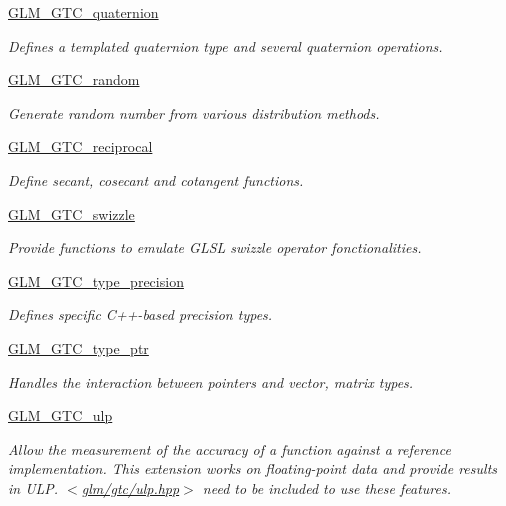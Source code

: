 \begin{DoxyCompactItemize}
\hyperlink{group__gtc__quaternion}{G\+L\+M\+\_\+\+G\+T\+C\+\_\+quaternion}
\begin{DoxyCompactList}\small\item\em Defines a templated quaternion type and several quaternion operations. \end{DoxyCompactList}\item 
\hyperlink{group__gtc__random}{G\+L\+M\+\_\+\+G\+T\+C\+\_\+random}
\begin{DoxyCompactList}\small\item\em Generate random number from various distribution methods. \end{DoxyCompactList}\item 
\hyperlink{group__gtc__reciprocal}{G\+L\+M\+\_\+\+G\+T\+C\+\_\+reciprocal}
\begin{DoxyCompactList}\small\item\em Define secant, cosecant and cotangent functions. \end{DoxyCompactList}\item 
\hyperlink{group__gtc__swizzle}{G\+L\+M\+\_\+\+G\+T\+C\+\_\+swizzle}
\begin{DoxyCompactList}\small\item\em Provide functions to emulate G\+L\+S\+L swizzle operator fonctionalities. \end{DoxyCompactList}\item 
\hyperlink{group__gtc__type__precision}{G\+L\+M\+\_\+\+G\+T\+C\+\_\+type\+\_\+precision}
\begin{DoxyCompactList}\small\item\em Defines specific C++-\/based precision types. \end{DoxyCompactList}\item 
\hyperlink{group__gtc__type__ptr}{G\+L\+M\+\_\+\+G\+T\+C\+\_\+type\+\_\+ptr}
\begin{DoxyCompactList}\small\item\em Handles the interaction between pointers and vector, matrix types. \end{DoxyCompactList}\item 
\hyperlink{group__gtc__ulp}{G\+L\+M\+\_\+\+G\+T\+C\+\_\+ulp}
\begin{DoxyCompactList}\small\item\em Allow the measurement of the accuracy of a function against a reference implementation. This extension works on floating-\/point data and provide results in U\+L\+P. $<$\hyperlink{gtc_2ulp_8hpp}{glm/gtc/ulp.\+hpp}$>$ need to be included to use these features. \end{DoxyCompactList}\end{DoxyCompactItemize}


